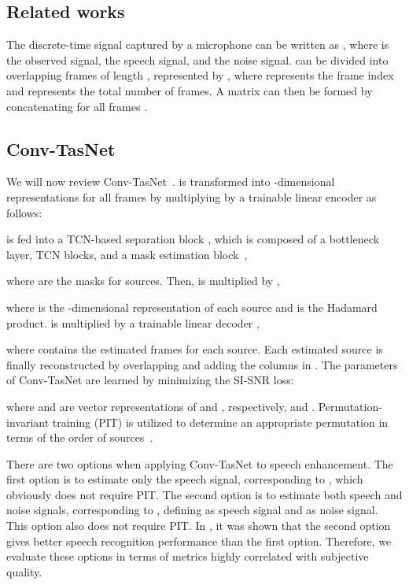\documentclass[a4paper]{article}
\begin{document}
\begin{spacing}{0.9}
\section{Related works}

The discrete-time signal captured by a microphone can be written as , 
where  is the observed signal,  the speech signal, and  the noise signal.
 can be divided into overlapping frames of length , represented by ,
where  represents the frame index and  represents the total number of frames.
A matrix  can then be formed by concatenating  for all frames .

\subsection{Conv-TasNet}
We will now review Conv-TasNet~\cite{luo2019conv}.
 is transformed into -dimensional representations   for all frames by multiplying by a trainable linear encoder  as follows:

 is fed into a TCN-based separation block , which is composed of a bottleneck layer, TCN blocks, and a mask estimation block~\cite{luo2019conv}, 

where 
are the masks for  sources.
Then, 
is multiplied by ,

where  is the -dimensional representation of each source and  is the Hadamard product.
 is multiplied by a trainable linear decoder ,

where 
contains the estimated frames for each source.
Each estimated source  is finally reconstructed by overlapping and adding the  columns in .
The parameters of Conv-TasNet are learned by minimizing the SI-SNR loss:

where   and 
are vector representations of  and , respectively, and .
Permutation-invariant training (PIT) is utilized to determine an appropriate permutation in terms of the order of sources~\cite{kolbaek2017multitalker}.

There are two options when applying Conv-TasNet to speech enhancement.
The first option is to estimate only the speech signal, corresponding to , which obviously does not require PIT.
The second option is to estimate both speech and noise signals, corresponding to , defining  as speech signal and  as noise signal. 
This option also does not require PIT.
In \cite{kinoshita2020improving}, it was shown that the second option gives better speech recognition performance than the first option.
Therefore, we evaluate these options in terms of metrics highly correlated with subjective quality.


\end{spacing}
\end{document}
